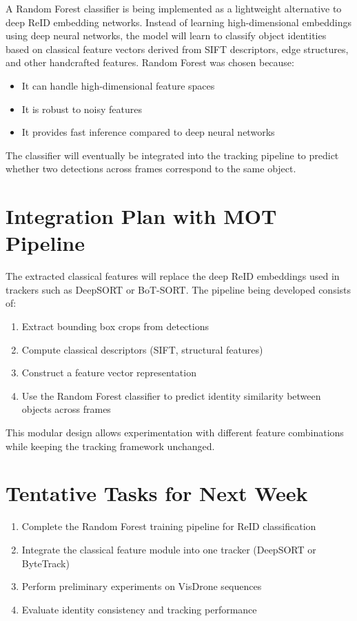 \documentclass[11pt,a4paper]{article}
\begin{document}
	A Random Forest classifier is being implemented as a lightweight alternative to deep ReID embedding networks. Instead of learning high-dimensional embeddings using deep neural networks, the model will learn to classify object identities based on classical feature vectors derived from SIFT descriptors, edge structures, and other handcrafted features. Random Forest was chosen because:
	\begin{itemize}
		\item It can handle high-dimensional feature spaces
		\item It is robust to noisy features
		\item It provides fast inference compared to deep neural networks
	\end{itemize}
	
	The classifier will eventually be integrated into the tracking pipeline to predict whether two detections across frames correspond to the same object.
	
	\section*{Integration Plan with MOT Pipeline}
	
	The extracted classical features will replace the deep ReID embeddings used in trackers such as DeepSORT or BoT-SORT. The pipeline being developed consists of:
	\begin{enumerate}
		\item Extract bounding box crops from detections
		\item Compute classical descriptors (SIFT, structural features)
		\item Construct a feature vector representation
		\item Use the Random Forest classifier to predict identity similarity between objects across frames
	\end{enumerate}
	
	This modular design allows experimentation with different feature combinations while keeping the tracking framework unchanged.
	
	\section*{Tentative Tasks for Next Week}
	
	\begin{enumerate}
		\item Complete the Random Forest training pipeline for ReID classification
		\item Integrate the classical feature module into one tracker (DeepSORT or ByteTrack)
		\item Perform preliminary experiments on VisDrone sequences
		\item Evaluate identity consistency and tracking performance
	\end{enumerate}
	
\end{document}
